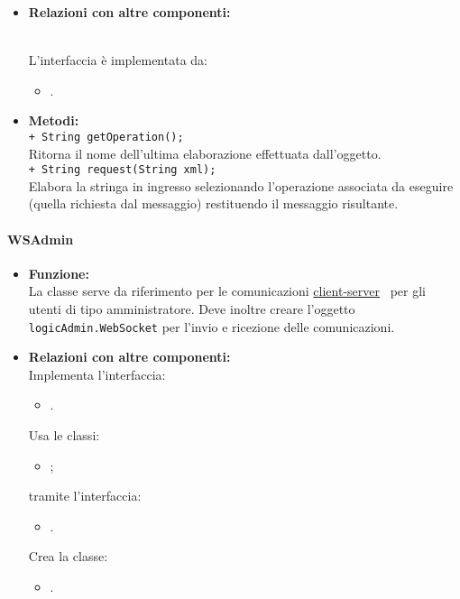 {{\begin{sloppypar}
{{{\begin{itemize}
				\item[] \textbf{Relazioni con altre componenti:}{\\
					L'interfaccia è implementata da:
					\begin{itemize}
						\item[]	.\\
					\end{itemize}
					}
			
				\item[] \textbf{Metodi:}{ \\
					\texttt{+ String getOperation();}\\
					Ritorna il nome dell'ultima elaborazione effettuata dall'oggetto.\\
					
					\texttt{+ String request(String xml);}\\
					Elabora la stringa in ingresso selezionando l'operazione associata da eseguire (quella richiesta dal messaggio) restituendo il messaggio risultante.\\
				}
				\end{itemize}
		}%



		\paragraph{WSAdmin}\label{par:WSAdmin}{
			\begin{itemize}
				\item[] \textbf{Funzione:}\\
					La classe serve da riferimento per le comunicazioni \underline{client-server}\g~ per gli utenti di tipo amministratore. Deve inoltre creare l'oggetto \texttt{logicAdmin.WebSocket} per l'invio e ricezione delle comunicazioni.\\
		
				\item[] \textbf{Relazioni con altre componenti:}\\
					Implementa l'interfaccia: 
						\begin{itemize}
							\item[] .
						\end{itemize}
					Usa le classi:
						\begin{itemize}
							\item[] ;
						\end{itemize}
					tramite l'interfaccia:
						\begin{itemize}
							\item[].
						\end{itemize}
					Crea la classe:
						\begin{itemize}
							\item[].\\
						\end{itemize}
				

\end{itemize}}}}
\end{sloppypar}}}
